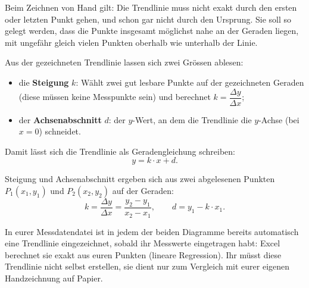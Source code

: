\documentclass[11pt,a4paper]{article}
\begin{document}
Beim Zeichnen von Hand gilt: Die Trendlinie muss nicht exakt durch den ersten oder letzten Punkt gehen, und schon gar nicht durch den Ursprung. Sie soll so gelegt werden, dass die Punkte insgesamt möglichst nahe an der Geraden liegen, mit ungefähr gleich vielen Punkten oberhalb wie unterhalb der Linie.

Aus der gezeichneten Trendlinie lassen sich zwei Grössen ablesen:
\begin{itemize}
  \item die \textbf{Steigung} $k$: Wählt zwei gut lesbare Punkte auf der gezeichneten Geraden (diese müssen keine Messpunkte sein) und berechnet $k = \dfrac{\Delta y}{\Delta x}$;
  \item der \textbf{Achsenabschnitt} $d$: der $y$-Wert, an dem die Trendlinie die $y$-Achse (bei $x=0$) schneidet.
\end{itemize}
Damit lässt sich die Trendlinie als Geradengleichung schreiben:
\[
  y = k\cdot x + d.
\]

\begin{center}
\end{center}
Steigung und Achsenabschnitt ergeben sich aus zwei abgelesenen Punkten $P_1(x_1,y_1)$ und $P_2(x_2,y_2)$ auf der Geraden:
\[
  k = \frac{\Delta y}{\Delta x} = \frac{y_2-y_1}{x_2-x_1}, \qquad d = y_1 - k\cdot x_1.
\]

\begin{tippbox}
In eurer Messdatendatei ist in jedem der beiden Diagramme bereits automatisch eine Trendlinie eingezeichnet, sobald ihr Messwerte eingetragen habt: Excel berechnet sie exakt aus euren Punkten (lineare Regression). Ihr müsst diese Trendlinie nicht selbst erstellen, sie dient nur zum Vergleich mit eurer eigenen Handzeichnung auf Papier.
\end{tippbox}
\end{document}
